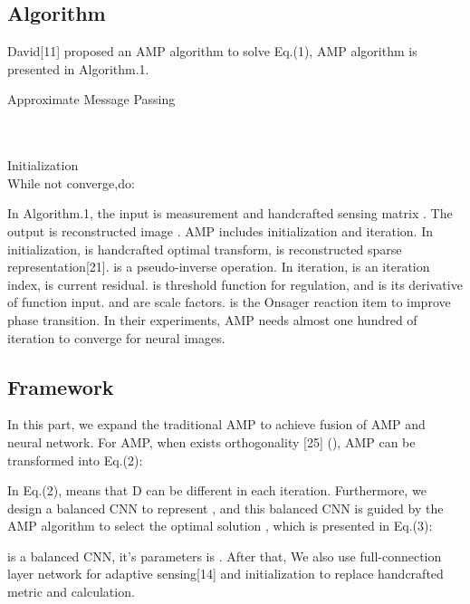 \documentclass[conference]{IEEEtran}
\begin{document}
\subsection{Algorithm}
David[11] proposed an AMP algorithm to solve Eq.(1), AMP algorithm is presented in Algorithm.1.
\begin{algorithm}
\caption{Approximate Message Passing}
\label{alg:Approximate Message Passing}
\begin{algorithmic}
\REQUIRE 
\ENSURE 
\\ 
\\Initialization
\STATE {} 
\\While not converge,do:
       \STATE 
       \STATE 
        \STATE 
        \\

\end{algorithmic}
\end{algorithm}
In Algorithm.1, the input is measurement  and handcrafted sensing matrix . The output is reconstructed image .
AMP includes initialization and iteration. In initialization,  is handcrafted optimal transform,  is reconstructed sparse representation[21].  is a pseudo-inverse operation. 
In iteration,  is an iteration index, is current residual.  is threshold function for    regulation, and  is its derivative of function input.  and   are scale factors.  is the Onsager reaction item to improve phase transition. In their experiments, AMP needs almost one hundred of iteration to converge for neural images. 

\subsection{Framework}
In this part, we expand the traditional AMP to achieve fusion of AMP and neural network. For AMP, when  exists orthogonality [25] (), AMP can be transformed into Eq.(2):
 
In Eq.(2),  means that D can be different in each iteration. Furthermore, we design a balanced CNN to represent , and this balanced CNN is guided by the AMP algorithm to select the optimal solution , which is presented in Eq.(3):

 is a balanced CNN, it’s parameters is . After that, We also use full-connection layer network for adaptive sensing[14] and initialization to replace handcrafted metric  and  calculation.
\end{document}
